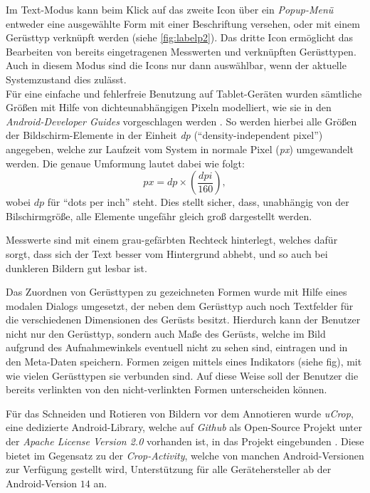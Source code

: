 Im Text-Modus kann beim Klick auf das zweite Icon über ein \emph{Popup-Menü} entweder eine ausgewählte Form mit einer Beschriftung versehen, oder mit einem Gerüsttyp verknüpft werden (siehe \autoref{fig:labelp2}).
Das dritte Icon ermöglicht das Bearbeiten von bereits eingetragenen Messwerten und verknüpften Gerüsttypen.
Auch in diesem Modus sind die Icons nur dann auswählbar, wenn der aktuelle Systemzustand dies zulässt. \\

Für eine einfache und fehlerfreie Benutzung auf Tablet-Geräten wurden sämtliche Größen mit Hilfe von dichteunabhängigen Pixeln modelliert, wie sie in den \emph{Android-Developer Guides} vorgeschlagen werden \citep{DP18}.
So werden hierbei alle Größen der Bildschirm-Elemente in der Einheit \emph{dp} (``density-independent pixel'') angegeben, welche zur Laufzeit vom System in normale Pixel (\emph{px}) umgewandelt werden.
Die genaue Umformung lautet dabei wie folgt:
\[
  px =  dp \times (\frac{dpi}{160}),
\]
wobei $dp$ für ``dots per inch'' steht.
Dies stellt sicher, dass, unabhängig von der Bilschirmgröße, alle Elemente ungefähr gleich groß dargestellt werden. \\

Messwerte sind mit einem grau-gefärbten Rechteck hinterlegt, welches dafür sorgt, dass sich der Text besser vom Hintergrund abhebt, und so auch bei dunkleren Bildern gut lesbar ist.

Das Zuordnen von Gerüsttypen zu gezeichneten Formen wurde mit Hilfe eines modalen Dialogs umgesetzt, der neben dem Gerüsttyp auch noch Textfelder für die verschiedenen Dimensionen des Gerüsts besitzt.
Hierdurch kann der Benutzer nicht nur den Gerüsttyp, sondern auch Maße des Gerüsts, welche im Bild aufgrund des Aufnahmewinkels eventuell nicht zu sehen sind, eintragen und in den Meta-Daten speichern.
Formen zeigen mittels eines Indikators (siehe fig), mit wie vielen Gerüsttypen sie verbunden sind.
Auf diese Weise soll der Benutzer die bereits verlinkten von den nicht-verlinkten Formen unterscheiden können. \\

Für das Schneiden und Rotieren von Bildern vor dem Annotieren wurde \emph{uCrop}, eine dedizierte Android-Library, welche auf \emph{Github} als Open-Source Projekt unter der \emph{Apache License Version 2.0} vorhanden ist, in das Projekt eingebunden \citep{UC18}.
Diese bietet im Gegensatz zu der \emph{Crop-Activity}, welche von manchen Android-Versionen zur Verfügung gestellt wird, Unterstützung für alle Gerätehersteller ab der Android-Version $14$ an.

